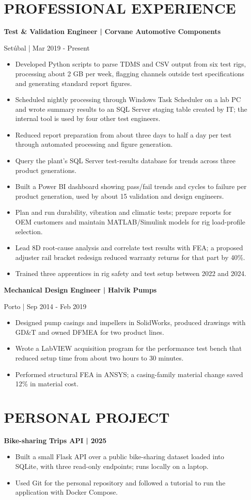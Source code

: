\documentclass[11pt,a4paper]{article}
\newcommand{\cvsection}[1]{\Needspace{4\baselineskip}\section*{#1}}
\newcommand{\cvitem}[1]{\par\needspace{4\baselineskip}\textbf{#1}\par}
\begin{document}
\cvsection{PROFESSIONAL EXPERIENCE}
\cvitem{Test \& Validation Engineer | Corvane Automotive Components}
Setúbal | Mar 2019 - Present
\begin{itemize}
\item Developed Python scripts to parse TDMS and CSV output from six test rigs, processing about 2 GB per week, flagging channels outside test specifications and generating standard report figures.
\item Scheduled nightly processing through Windows Task Scheduler on a lab PC and wrote summary results to an SQL Server staging table created by IT; the internal tool is used by four other test engineers.
\item Reduced report preparation from about three days to half a day per test through automated processing and figure generation.
\item Query the plant's SQL Server test-results database for trends across three product generations.
\item Built a Power BI dashboard showing pass/fail trends and cycles to failure per product generation, used by about 15 validation and design engineers.
\item Plan and run durability, vibration and climatic tests; prepare reports for OEM customers and maintain MATLAB/Simulink models for rig load-profile selection.
\item Lead 8D root-cause analysis and correlate test results with FEA; a proposed adjuster rail bracket redesign reduced warranty returns for that part by 40\%.
\item Trained three apprentices in rig safety and test setup between 2022 and 2024.
\end{itemize}

\cvitem{Mechanical Design Engineer | Halvik Pumps}
Porto | Sep 2014 - Feb 2019
\begin{itemize}
\item Designed pump casings and impellers in SolidWorks, produced drawings with GD\&T and owned DFMEA for two product lines.
\item Wrote a LabVIEW acquisition program for the performance test bench that reduced setup time from about two hours to 30 minutes.
\item Performed structural FEA in ANSYS; a casing-family material change saved 12\% in material cost.
\end{itemize}

\cvsection{PERSONAL PROJECT}
\cvitem{Bike-sharing Trips API | 2025}
\begin{itemize}
\item Built a small Flask API over a public bike-sharing dataset loaded into SQLite, with three read-only endpoints; runs locally on a laptop.
\item Used Git for the personal repository and followed a tutorial to run the application with Docker Compose.
\end{itemize}
\end{document}
